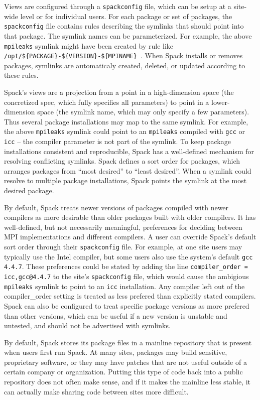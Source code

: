 Views are configured through a {\tt spackconfig} file, which can be setup at a site-wide level or for individual users.
For each package or set of packages, the {\tt spackconfig} file contains rules
describing the symlinks that should point into that package.
The symlink names can be parameterized.
For example, the above {\tt mpileaks} symlink might have been created by rule like
{\tt /opt/\$\{PACKAGE\}-\$\{VERSION\}-\$\{MPINAME\} }.
When Spack installs or removes packages,
symlinks are automaticaly created, deleted, or updated according to these rules.  

Spack's views are a projection from a point in a high-dimension space
(the concretized spec, which fully specifies all parameters) to point in a lower-dimension space
(the symlink name, which may only specify a few parameters).
Thus several package installations may map to the same symlink.
For example, the above {\tt mpileaks} symlink could point to an {\tt mpileaks} compiled with
{\tt gcc} or {\tt icc} -- the compiler parameter is not part of the symlink.
To keep  package installations  consistent and reproducible,
Spack has a well-defined mechanism for resolving conflicting symlinks.
Spack defines a sort order for packages, which arranges packages from ``most desired'' to ``least desired''.
When a symlink could resolve to multiple package installations,
Spack points the symlink at the most desired package.  

By default, Spack treats newer versions of packages compiled with newer compilers
as more desirable than older packages built with older compilers.
It has well-defined, but not necessarily meaningful,
preferences for deciding between MPI implementations and different compilers.
A user can override Spack's default sort order through their {\tt spackconfig} file.
For example, at one site users may typically use the Intel compiler,
but some users also use the system's default {\tt gcc 4.4.7}.
These preferences could be stated by adding the line
{\tt compiler\_order = icc,gcc@4.4.7} to the site's {\tt spackconfig} file,
which would cause the ambigious {\tt mpileaks} symlink to point to an {\tt icc} installation.
Any compiler left out of the compiler\_order setting is treated as less prefered than explicitly stated compilers.
Spack can also be configured to treat specific package versions as more prefered than other versions,
which can be useful if a new version is unstable and untested, and should not be advertised with symlinks.  


By default, Spack stores its package files in a mainline repository that is present when users
first run Spack.  At many sites, packages may build sensitive, proprietary software, or they 
may have patches that are not useful outside of a certain company or organization.  Putting
this type of code back into a public repository does not often make sense, and if it makes the
mainline less stable, it can actually make sharing code between sites more difficult.  

